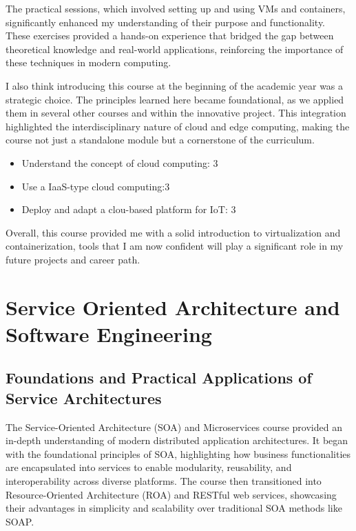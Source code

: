 The practical sessions, which involved setting up and using VMs and containers, significantly enhanced my understanding of their purpose and functionality. These exercises provided a hands-on experience that bridged the gap between theoretical knowledge and real-world applications, reinforcing the importance of these techniques in modern computing.

I also think introducing this course at the beginning of the academic year was a strategic choice. The principles learned here became foundational, as we applied them in several other courses and within the innovative project. This integration highlighted the interdisciplinary nature of cloud and edge computing, making the course not just a standalone module but a cornerstone of the curriculum.


\begin{itemize}
    \item Understand the concept of cloud computing: 3
    \item Use a IaaS-type cloud computing:3
    \item Deploy and adapt a clou-based platform for IoT: 3
\end{itemize}

Overall, this course provided me with a solid introduction to virtualization and containerization, tools that I am now confident will play a significant role in my future projects and career path.

\section{Service Oriented Architecture and Software Engineering }

\subsection{Foundations and Practical Applications of Service Architectures}

The Service-Oriented Architecture (SOA) and Microservices course provided an in-depth understanding of modern distributed application architectures. It began with the foundational principles of SOA, highlighting how business functionalities are encapsulated into services to enable modularity, reusability, and interoperability across diverse platforms. The course then transitioned into Resource-Oriented Architecture (ROA) and RESTful web services, showcasing their advantages in simplicity and scalability over traditional SOA methods like SOAP.

